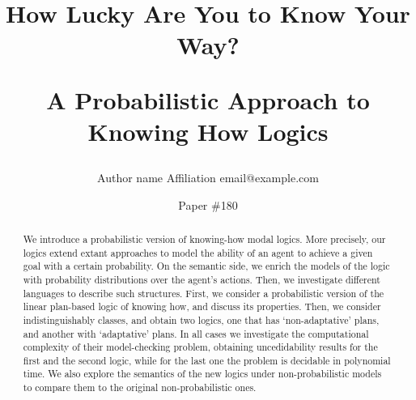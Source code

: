 \documentclass{article}
\title{How Lucky Are You to Know Your Way?\par A Probabilistic Approach to Knowing How Logics}   %
\author{%
    Author name
    \affiliations
    Affiliation
    \emails
    email@example.com    %
}
\author{Paper \#180}
\begin{document}
\maketitle

\begin{abstract}
  We introduce a probabilistic version of knowing-how modal logics.  More precisely,  our logics extend extant approaches to model the ability of an agent to achieve a given goal with a certain probability.  On the semantic side,  we enrich the models of the logic with probability distributions over the agent's actions.  Then, we investigate different languages to describe such structures.  First,  we consider a probabilistic version of the linear plan-based logic of knowing how, and discuss its properties. Then, we consider indistinguishably classes,  and obtain two logics,  one that has `non-adaptative' plans, and another  with `adaptative' plans. In all cases we investigate the computational complexity of their model-checking problem, obtaining uncedidability results for the first and the second logic, while for the last one the problem is decidable in polynomial time. We also explore the semantics of the new logics under non-probabilistic models to compare them to the original non-probabilistic ones.
\end{abstract}


















\newpage
\onecolumn
\appendix


\end{document}
